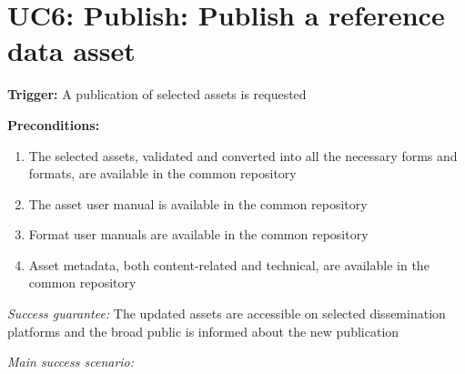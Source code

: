 	\section{UC6: Publish: Publish a reference data asset}
	\label{sec:uc6}		
	
	\textbf{Trigger:} A publication of selected assets is requested
	
	\textbf{Preconditions:} 
	\begin{enumerate}
		\item The selected assets, validated and converted into all the necessary forms and formats, are available in the common repository
		\item The asset user manual is available in the common repository
		\item Format user manuals are available in the common repository
		\item Asset metadata, both content-related and technical, are available in the common repository
	\end{enumerate}

	\textit{Success guarantee:} The updated assets are accessible on selected dissemination platforms and the broad public is informed about the new publication

	\textit{Main success scenario:} 
	
